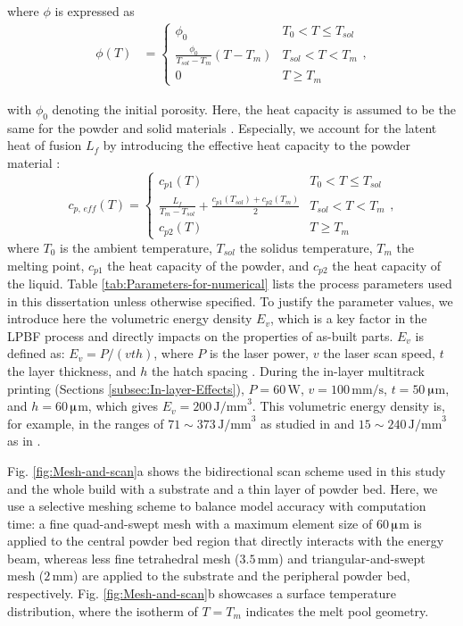 \documentclass [11pt, proquest] {uwthesis}[2020/02/24]
\begin{document}
\noindent where $\phi$ is expressed as
\begin{align*}
\phi(T) & =\begin{cases}
\phi_{0} & T_{0}<T\leq T_{sol}\\
\frac{\phi_{0}}{T_{sol}-T_{m}}(T-T_{m}) & T_{sol}<T<T_{m}\\
0 & T\geq T_{m}
\end{cases},
\end{align*}

\noindent with $\phi_{0}$ denoting the initial porosity. Here, the
heat capacity is assumed to be the same for the powder and solid materials
\cite{karayagiz2019numerical}. Especially, we account for the latent
heat of fusion $L_{f}$ by introducing the effective heat capacity
to the powder material \cite{Yadroitsev2009}:
\begin{equation}
c_{p,\,eff}(T)=\begin{cases}
c_{p1}(T) & T_{0}<T\leq T_{sol}\\
\frac{L_{f}}{T_{m}-T_{sol}}+\frac{c_{p1}(T_{sol})+c_{p2}(T_{m})}{2} & T_{sol}<T<T_{m}\\
c_{p2}(T) & T\geq T_{m}
\end{cases},\label{eq:effective_heat_cap}
\end{equation}
\noindent where $T_{0}$ is the ambient temperature, $T_{sol}$ the solidus
temperature, $T_{m}$ the melting point, $c_{p1}$ the heat capacity
of the powder, and $c_{p2}$ the heat capacity of the liquid. Table
\ref{tab:Parameters-for-numerical} lists the process parameters used
in this dissertation unless otherwise specified. To justify the parameter
values, we introduce here the volumetric energy density $E_{v}$,
which is a key factor in the LPBF process and directly impacts on the
properties of as-built parts. $E_{v}$ is defined as: $E_{v}=P/\left(vth\right)$,
where $P$ is the laser power, $v$ the laser scan speed, $t$ the
layer thickness, and $h$ the hatch spacing \cite{cepeda2020effect}.
During the in-layer multitrack printing (Sections \ref{subsec:In-layer-Effects}), $P=60\,\mathrm{W}$, $v=100\,\mathrm{mm/s}$,
$t=50\,$$\muup$m, and $h=60\,$$\muup$m, which gives $E_{v}=200\,\mathrm{J/mm}^{3}$.
This volumetric energy density is, for example, in the ranges of $71\sim373\,\mathrm{J/mm}^{3}$
as studied in \cite{thijs2010study} and $15\sim240\,\mathrm{J/mm}^{3}$
as in \cite{majumdar2019understanding}.

Fig. \ref{fig:Mesh-and-scan}a shows the bidirectional scan scheme
used in this study and the whole build with a substrate and a thin
layer of powder bed. Here, we use a selective meshing scheme to balance
model accuracy with computation time: a fine quad-and-swept mesh with
a maximum element size of $60\,$$\muup$m is applied to the central
powder bed region that directly interacts with the energy beam, whereas
less fine tetrahedral mesh ($3.5\,\text{mm}$) and triangular-and-swept
mesh ($2\,\text{mm}$) are applied to the substrate and the peripheral
powder bed, respectively. Fig. \ref{fig:Mesh-and-scan}b showcases
a surface temperature distribution, where the isotherm of $T=T_{m}$
indicates the melt pool geometry.
\end{document}

